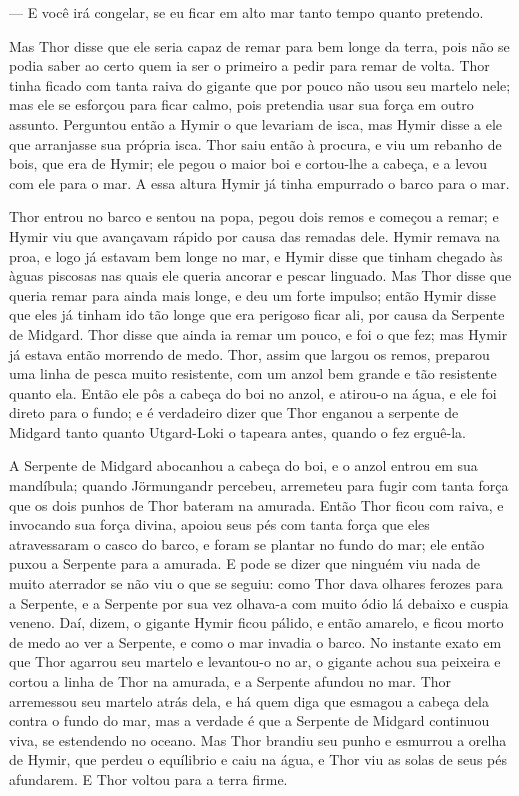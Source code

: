 — E você irá congelar, se eu ficar em alto mar tanto tempo quanto
pretendo. 

Mas Thor disse que ele seria capaz de remar para bem longe da terra,
pois não se podia saber ao certo quem ia ser o primeiro a pedir para
remar de volta. Thor tinha ficado com tanta raiva do gigante que por
pouco não usou seu martelo nele; mas ele se esforçou para ficar
calmo, pois pretendia usar sua força em outro assunto. Perguntou
então a Hymir o que levariam de isca, mas Hymir disse a ele que
arranjasse sua própria isca. Thor saiu então à procura, e viu um
rebanho de bois, que era de Hymir; ele pegou o maior boi e cortou-lhe
a cabeça, e a levou com ele para o mar. A essa altura Hymir já tinha
empurrado o barco para o mar. 

Thor entrou no barco e sentou na popa, pegou dois remos e começou a
remar; e Hymir viu que avançavam rápido por causa das remadas dele.
Hymir remava na proa, e logo já estavam bem longe no mar, e Hymir
disse que tinham chegado às àguas piscosas nas quais ele queria
ancorar e pescar linguado. Mas Thor disse que queria remar para ainda
mais longe, e deu um forte impulso; então Hymir disse que eles já
tinham ido tão longe que era perigoso ficar ali, por causa da
Serpente de Midgard. Thor disse que ainda ia remar um pouco, e foi o
que fez; mas Hymir já estava então morrendo de medo. Thor, assim que
largou os remos, preparou uma linha de pesca muito resistente, com um
anzol bem grande e tão resistente quanto ela. Então ele pôs a cabeça
do boi no anzol, e atirou-o na água, e ele foi direto para o fundo; e
é verdadeiro dizer que Thor enganou a serpente de Midgard tanto
quanto Utgard-Loki o tapeara antes, quando o fez erguê-la.

A Serpente de Midgard abocanhou a cabeça do boi, e o anzol entrou em
sua mandíbula; quando Jörmungandr percebeu, arremeteu para fugir com
tanta força que os dois punhos de Thor bateram na amurada. Então Thor
ficou com raiva, e invocando sua força divina, apoiou seus pés com
tanta força que eles atravessaram o casco do barco, e foram se
plantar no fundo do mar; ele então puxou a Serpente para a amurada. E
pode se dizer que ninguém viu nada de muito aterrador se não viu o
que se seguiu: como Thor dava olhares ferozes para a Serpente, e a
Serpente por sua vez olhava-a com muito ódio lá debaixo e cuspia
veneno. Daí, dizem, o gigante Hymir ficou pálido, e então amarelo, e
ficou morto de medo ao ver a Serpente, e como o mar invadia o barco.
No instante exato em que Thor agarrou seu martelo e levantou-o no ar,
o gigante achou sua peixeira e cortou a linha de Thor na amurada, e a
Serpente afundou no mar. Thor arremessou seu martelo atrás dela, e há
quem diga que esmagou a cabeça dela contra o fundo do mar, mas a
verdade é que a Serpente de Midgard continuou viva, se estendendo no
oceano. Mas Thor brandiu seu punho e esmurrou a orelha de Hymir, que
perdeu o equílibrio e caiu na água, e Thor viu as solas de seus pés
afundarem. E Thor voltou para a terra firme.

